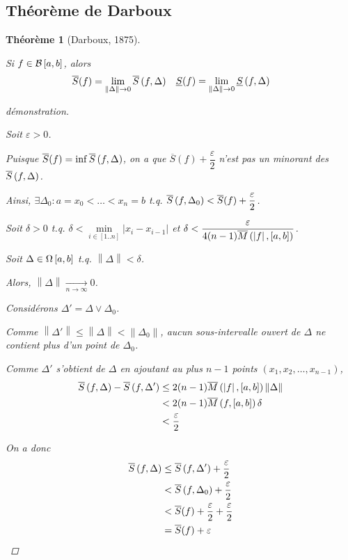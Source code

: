 \documentclass{report}
\newcommand*{\Ssup}[1]{\overline{S}(#1)}
\newcommand*{\Sinf}[1]{\underline{S}(#1)}
\newcommand*{\raffinement}[2]{#1 \vee #2}
\newcommand*{\norme}[1]{\left\| #1 \right\|}
\newcommand*{\abs}[1]{\left| #1 \right|}
\newcommand*{\eps}{\varepsilon}
\newtheorem*{thm}{Th\'eor\`eme}
\theoremstyle{definition}
\theoremstyle{remark}
\begin{document}
	\subsection{Th\'eor\`eme de Darboux}
	\begin{thm}[Darboux, 1875]
		~

		Si $f \in \bornee$, alors
		\begin{align*}
			\begin{split}
				\Ssup{f}&= \lim\limits_{\norme{\Delta} \to 0} \ssup{f}
			\end{split}
			&
			\begin{split}
				\Sinf{f}&= \lim\limits_{\norme{\Delta} \to 0} \sinf{f}
			\end{split}
		\end{align*}

		\begin{proof}[d\'emonstration]~

			Soit $\eps>0$.

			Puisque $\Ssup{f} = \inf \ssup{f}$, on a que $\Ssup{f} + \dfrac{\eps}{2}$ n'est pas un minorant des $\ssup{f}$.

			Ainsi, $\exists\Delta_0 : a=x_0 < \dotsc < x_n=b$ t.q. $\ssup{f}[\Delta_0] < \Ssup{f} + \dfrac{\eps}{2}$.

			Soit $\delta>0$ t.q. $\delta < \min\limits_{i \in [1..n]}\abs{x_i-x_{i-1}}$ et $\delta < \dfrac{\eps}{4 (n-1) \msup{\abs{f}}}$.

			Soit $\Delta \in \partitions$ t.q. $\norme{\Delta} < \delta$.

			Alors, $\norme{\Delta} \xrightarrow[n \to \infty]{} 0$.

			Consid\'erons $\Delta' = \raffinement{\Delta}{\Delta_0}$.

			Comme $\norme{\Delta'} \leq \norme{\Delta} < \norme{\Delta_0}$, aucun sous-intervalle ouvert de $\Delta$ ne contient plus d'un point de $\Delta_0$.

			Comme $\Delta'$ s'obtient de $\Delta$ en ajoutant au plus $n-1$ points $\left( x_1, x_2, \dotsc, x_{n-1} \right)$,
			\begin{align*}
				\ssup{f} - \ssup{f}[\Delta'] &\leq 2(n-1) \msup{\abs{f}} \norme{\Delta}\\
				&< 2(n-1) \msup{f} \delta\\
				&< \dfrac{\eps}{2}
			\end{align*}

			On a donc
			\begin{align*}
				\ssup{f} &\leq \ssup{f}[\Delta'] + \dfrac{\eps}{2}\\
				&< \ssup{f}[\Delta_0] + \dfrac{\eps}{2}\\
				&< \Ssup{f} + \dfrac{\eps}{2} + \dfrac{\eps}{2}\\
				&= \Ssup{f} + \eps
			\end{align*}


\end{proof}
\end{thm}
\end{document}
